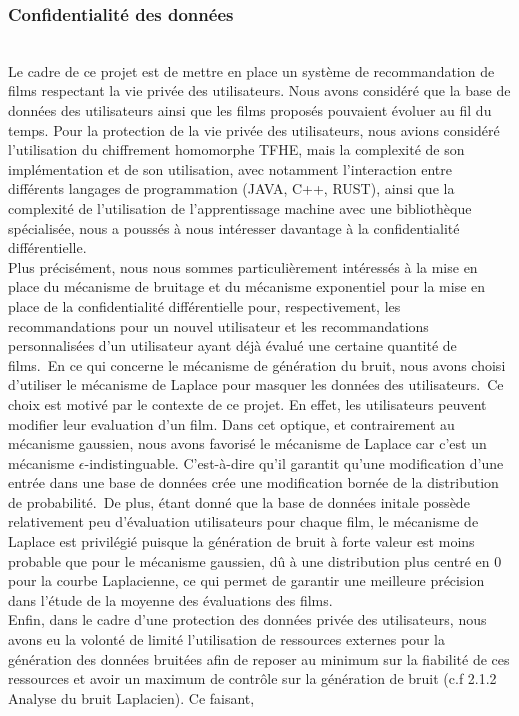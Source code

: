 \documentclass{article}
\begin{document}
\subsubsection{Confidentialité des données}
$ $\\
Le cadre de ce projet est de mettre en place un système de recommandation de films respectant la vie privée des utilisateurs. Nous avons
considéré que la base de données des utilisateurs ainsi que les films proposés pouvaient évoluer au fil du temps.
Pour la protection de la vie privée des utilisateurs, nous avions considéré l'utilisation du chiffrement homomorphe TFHE, mais
la complexité de son implémentation et de son utilisation, avec notamment l'interaction entre différents langages de programmation (JAVA, C++, RUST),
ainsi que la complexité de l'utilisation de l'apprentissage machine avec une bibliothèque spécialisée, nous a poussés à nous intéresser davantage à la confidentialité différentielle.\\
Plus précisément, nous nous sommes particulièrement intéressés à la mise en place du mécanisme de bruitage et du mécanisme exponentiel pour la mise
en place de la confidentialité différentielle pour, respectivement, les recommandations pour un nouvel utilisateur et les recommandations personnalisées
d'un utilisateur ayant déjà évalué une certaine quantité de films.\
En ce qui concerne le mécanisme de génération du bruit, nous avons choisi d'utiliser le mécanisme de Laplace pour masquer les données des utilisateurs.\
Ce choix est motivé par le contexte de ce projet. En effet, les utilisateurs peuvent modifier leur evaluation d'un film. Dans cet optique, et contrairement au 
mécanisme gaussien, nous avons favorisé le mécanisme de Laplace car c'est un mécanisme $\epsilon$-indistinguable. C'est-à-dire qu'il garantit qu'une 
modification d'une entrée dans une base de données crée une modification bornée de la distribution de probabilité.\
De plus, étant donné que la base de données initale possède relativement peu d'évaluation utilisateurs pour chaque film, le mécanisme de Laplace est privilégié
puisque la génération de bruit à forte valeur est moins probable que pour le mécanisme gaussien, dû à une distribution plus centré en 0 pour la courbe Laplacienne, 
ce qui permet de garantir une meilleure précision dans l'étude de la moyenne des évaluations des films.\\
Enfin, dans le cadre d'une protection des données privée des utilisateurs, nous avons eu la volonté de limité l'utilisation de ressources externes 
pour la génération des données bruitées afin de reposer au minimum sur la fiabilité de ces ressources et avoir un maximum de contrôle sur la génération de bruit (c.f 2.1.2 Analyse du bruit Laplacien). Ce faisant, 
\end{document}
